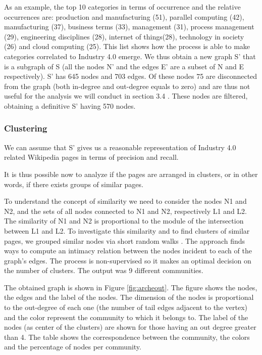 \documentclass[]{book}
\theoremstyle{definition}
\theoremstyle{definition}
\theoremstyle{definition}
\theoremstyle{remark}
\begin{document}
As an example, the top 10 categories in terms of occurrence and the
relative occurrences are: production and manufacturing (51), parallel
computing (42), manufacturing (37), business terms (33), management
(31), process management (29), engineering disciplines (28), internet of
things(28), technology in society (26) and cloud computing (25). This
list shows how the process is able to make categories correlated to
Industry 4.0 emerge. We thus obtain a new graph S' that is a subgraph of
S (all the nodes N' and the edges E' are a subset of N and E
respectively). S' has 645 nodes and 703 edges. Of these nodes 75 are
disconnected from the graph (both in-degree and out-degree equals to
zero) and are thus not useful for the analysis we will conduct in
section 3.4 . These nodes are filtered, obtaining a definitive S' having
570 nodes.

\subsubsection*{Clustering}\label{clustering-2}

We can assume that S' gives us a reasonable representation of Industry
4.0 related Wikipedia pages in terms of precision and recall.

It is thus possible now to analyze if the pages are arranged in
clusters, or in other words, if there exists groups of similar pages.

To understand the concept of similarity we need to consider the nodes N1
and N2, and the sets of all nodes connected to N1 and N2, respectively
L1 and L2. The similarity of N1 and N2 is proportional to the module of
the intersection between L1 and L2. To investigate this similarity and
to find clusters of similar pages, we grouped similar nodes via short
random walks \citep{durrett2007random}. The approach finds ways to
compute an intimacy relation between the nodes incident to each of the
graph's edges. The process is non-supervised so it makes an optimal
decision on the number of clusters. The output was 9 different
communities.

The obtained graph is shown in Figure \ref{fig:archeout}. The figure
shows the nodes, the edges and the label of the nodes. The dimension of
the nodes is proportional to the out-degree of each one (the number of
tail edges adjacent to the vertex) and the color represent the community
to which it belongs to. The label of the nodes (as center of the
clusters) are shown for those having an out degree greater than 4. The
table shows the correspondence between the community, the colors and the
percentage of nodes per community.
\end{document}
